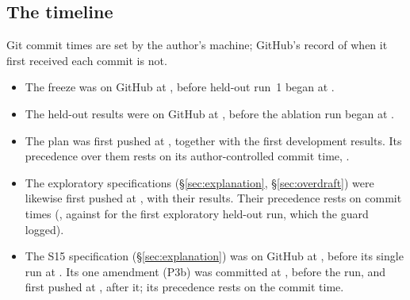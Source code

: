 \subsection{The timeline}
\label{sec:timeline}
Git commit times are set by the author's machine; GitHub's record of when
it first received each commit is not.
\begin{itemize}
  \item The freeze was on GitHub at , before held-out run~1
  began at .
  \item The held-out results were on GitHub at , before the
  ablation run began at .
  \item The plan was first pushed at , together with the
  first development results. Its precedence over them rests on its
  author-controlled commit time, .
  \item The exploratory specifications (\S\ref{sec:explanation},
  \S\ref{sec:overdraft}) were likewise first pushed at
  , with their results. Their precedence rests on commit
  times (, against  for the first
  exploratory held-out run, which the guard logged).
  \item The S15 specification (\S\ref{sec:explanation}) was on
  GitHub at , before its single run at
  . Its one amendment (P3b) was committed at
  , before the run, and first pushed at
  , after it; its precedence rests on the commit time.
\end{itemize}


\begin{table}[htbp]
\centering\scriptsize
{}
\caption{Protocol timeline. Commit times are from git; ``first on GitHub''
is the time of the first push containing the commit, from GitHub's
repository activity record. The held-out runs carry the times their guard
logged.}
\label{tab:timeline}
\end{table}



